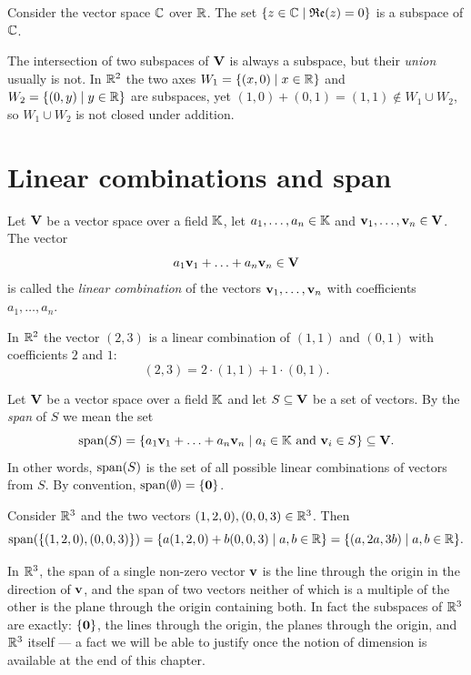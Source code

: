 \begin{example}
Consider the vector space $\mathbb{C}$ over $\mathbb{R}$. The set $\{z\in\mathbb{C}\mid \mathfrak{Re}(z) = 0\}$ is a subspace of $\mathbb{C}$.
\end{example}

\begin{warning}
The intersection of two subspaces of $\mathbf{V}$ is always a subspace, but their \emph{union} usually is not. In
$\mathbb{R}^2$ the two axes $W_1 = \{(x,0)\mid x\in\mathbb{R}\}$ and $W_2 = \{(0,y)\mid y\in\mathbb{R}\}$ are subspaces, yet
$(1,0)+(0,1) = (1,1)\notin W_1\cup W_2$, so $W_1\cup W_2$ is not closed under addition.
\end{warning}

\section{Linear combinations and span}

\begin{definition}
Let $\mathbf{V}$ be a vector space over a field $\mathbb{K}$, let $a_1,\ldots,a_n\in \mathbb{K}$ and $\mathbf{v}_1,\ldots,\mathbf{v}_n\in \mathbf{V}$. The vector
\[
a_1\mathbf{v}_1+\ldots + a_n\mathbf{v}_n\in \mathbf{V}
\]
is called the \emph{linear combination} of the vectors $\mathbf{v}_1,\ldots,\mathbf{v}_n$ with coefficients $a_1,\ldots,a_n$.
\end{definition}

\begin{example}
In $\mathbb{R}^2$ the vector $(2,3)$ is a linear combination of $(1,1)$ and $(0,1)$ with coefficients $2$ and $1$:
\[
(2,3) = 2\cdot (1,1) + 1\cdot (0,1).
\]
\end{example}

\begin{definition}
Let $\mathbf{V}$ be a vector space over a field $\mathbb{K}$ and let $S\subseteq \mathbf{V}$ be a set of vectors. By the \emph{span} of
$S$ we mean the set
\[
\operatorname{span}\!\left(S\right) = \{a_1\mathbf{v}_1+\ldots + a_n\mathbf{v}_n\mid a_i\in \mathbb{K} \text{ and } \mathbf{v}_i\in S\}\subseteq \mathbf{V}.
\]
In other words, $\operatorname{span}\!\left(S\right)$ is the set of all possible linear combinations of vectors from $S$. By
convention, $\operatorname{span}\!\left(\emptyset\right) = \{\mathbf{0}\}$.
\end{definition}

\begin{example}
Consider $\mathbb{R}^3$ and the two vectors $(1,2,0),(0,0,3)\in \mathbb{R}^3$. Then
\[
\operatorname{span}\!\left(\{(1,2,0),(0,0,3)\}\right) = \{ a(1,2,0)+b(0,0,3)\mid a,b\in \mathbb{R}\} = \{ (a,2a,3b)\mid a,b\in \mathbb{R}\}.
\]
\end{example}

\begin{remark}
In $\mathbb{R}^3$, the span of a single non-zero vector $\mathbf{v}$ is the line through the origin in the direction of
$\mathbf{v}$, and the span of two vectors neither of which is a multiple of the other is the plane through the
origin containing both. In fact the subspaces of $\mathbb{R}^3$ are exactly: $\{\mathbf{0}\}$, the lines through the
origin, the planes through the origin, and $\mathbb{R}^3$ itself — a fact we will be able to justify once the
notion of dimension is available at the end of this chapter.
\end{remark}

